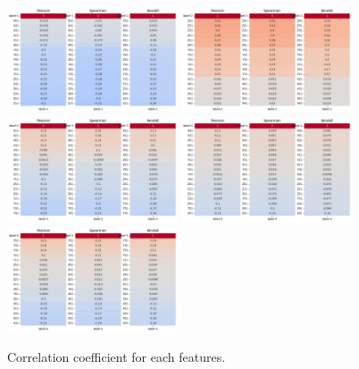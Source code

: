 \documentclass[11pt]{article}
\begin{document}
\begin{figure}[H]
  \centering
  \includegraphics[width=0.45\textwidth]{../code/Task2/Analysis/corrcoef-1.jpg}
  \includegraphics[width=0.45\textwidth]{../code/Task2/Analysis/corrcoef-2.jpg} \\
  \includegraphics[width=0.45\textwidth]{../code/Task2/Analysis/corrcoef-3.jpg}
  \includegraphics[width=0.45\textwidth]{../code/Task2/Analysis/corrcoef-4.jpg} \\
  \includegraphics[width=0.45\textwidth]{../code/Task2/Analysis/corrcoef-5.jpg}
  \caption{Correlation coefficient for each features.}
  \label{task-2-correlation-coefficient}
\end{figure}
\end{document}
